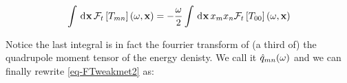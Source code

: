\documentclass[
  letterpaper,
  DIV=11,
  numbers=noendperiod,
  oneside]{scrreprt}
\begin{document}
\[
\int \,\mathrm{d}^{}\mathbf{x}\, \mathtip{\mathcal{F}_{t}\left[\texttip{\texttip{T}{Stress-Energy tensor, or energy-momentum tensor}_{mn}}{covariant Stress-Energy tensor component}\right]}{\text{Fourier transform of $\texttip{\texttip{T}{Stress-Energy tensor, or energy-momentum tensor}_{mn}}{covariant Stress-Energy tensor component}$ in variable $t$: }{\mathcal{F}_{t}\left[\texttip{\texttip{T}{Stress-Energy tensor, or energy-momentum tensor}_{mn}}{covariant Stress-Energy tensor component}\right] = \int \,\mathrm{d}^{}t\, \texttip{\texttip{T}{Stress-Energy tensor, or energy-momentum tensor}_{mn}}{covariant Stress-Energy tensor component}(t) \oldexp{\mathtip{{\mathring{\imath}}}{\text{Complex unit: } {\mathring{\imath}}^2 = -1}\omega \cdot t}   }}(\omega,\mathbf{x})=-\frac{\omega}{2} \int \,\mathrm{d}^{}\mathbf{x}\, \texttip{x_{m}}{covariant mathbftor component}\texttip{x_{n}}{covariant mathbftor component} \mathtip{\mathcal{F}_{t}\left[\texttip{\texttip{T}{Stress-Energy tensor, or energy-momentum tensor}_{00}}{covariant Stress-Energy tensor component}\right]}{\text{Fourier transform of $\texttip{\texttip{T}{Stress-Energy tensor, or energy-momentum tensor}_{00}}{covariant Stress-Energy tensor component}$ in variable $t$: }{\mathcal{F}_{t}\left[\texttip{\texttip{T}{Stress-Energy tensor, or energy-momentum tensor}_{00}}{covariant Stress-Energy tensor component}\right] = \int \,\mathrm{d}^{}t\, \texttip{\texttip{T}{Stress-Energy tensor, or energy-momentum tensor}_{00}}{covariant Stress-Energy tensor component}(t) \oldexp{\mathtip{{\mathring{\imath}}}{\text{Complex unit: } {\mathring{\imath}}^2 = -1}\omega \cdot t}   }}(\omega,\mathbf{x})
\]

Notice the last integral is in fact the fourrier transform of (a third
of) the quadrupole moment tensor of the energy denisty\sidenote{\footnotesize \[q_{mn}=3\int \texttip{x_{m}}{covariant mathbftor component}\texttip{x_{n}}{covariant mathbftor component} \texttip{\texttip{T}{Stress-Energy tensor, or energy-momentum tensor}_{00}}{covariant Stress-Energy tensor component}(\omega,\mathbf{x})\]}.
We call it
\(\mathtip{\hat{q}}{\text{Fourier transform of $q$ in variable $t$: }{\hat{q}\left(\omega\right)
 = \int \,\mathrm{d}^{}t\, q(t) \oldexp{\mathtip{{\mathring{\imath}}}{\text{Complex unit: } {\mathring{\imath}}^2 = -1}\omega \cdot t}}}_{mn}(\omega)\)
and we can finally rewrite \ref{eq-FTweakmet2} as:
\end{document}
